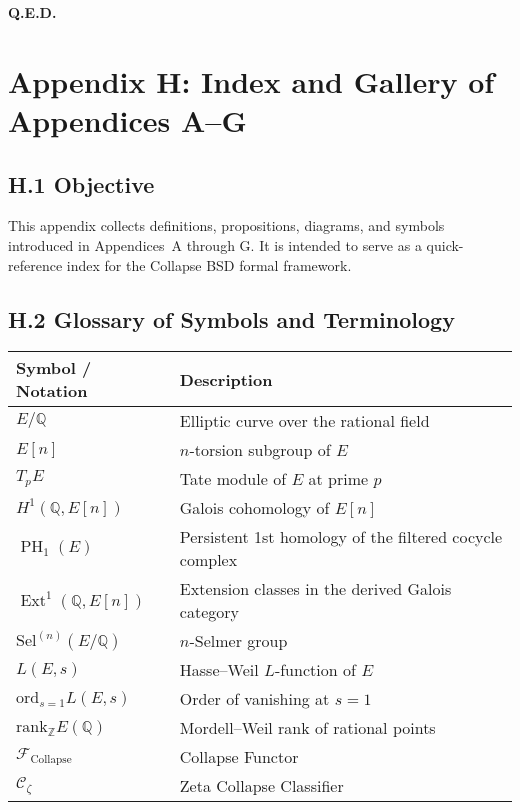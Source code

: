 \documentclass[11pt]{article}
\DeclareMathOperator{\Ext}{Ext}
\DeclareMathOperator{\PH}{PH}
\newcommand{\QQ}{\mathbb{Q}}
\newcommand{\ZZ}{\mathbb{Z}}
\begin{document}
\begin{flushright}
\textbf{Q.E.D.}
\end{flushright}




\section*{Appendix H: Index and Gallery of Appendices A--G}

\subsection*{H.1 Objective}

This appendix collects definitions, propositions, diagrams, and symbols introduced in Appendices~A through G.  
It is intended to serve as a quick-reference index for the Collapse BSD formal framework.

\subsection*{H.2 Glossary of Symbols and Terminology}

\begin{center}
\begin{tabular}{|l|l|}
\hline
\textbf{Symbol / Notation} & \textbf{Description} \\
\hline
$E/\QQ$ & Elliptic curve over the rational field \\
$E[n]$ & $n$-torsion subgroup of $E$ \\
$T_p E$ & Tate module of $E$ at prime $p$ \\
$H^1(\QQ, E[n])$ & Galois cohomology of $E[n]$ \\
$\PH_1(E)$ & Persistent 1st homology of the filtered cocycle complex \\
$\Ext^1(\QQ, E[n])$ & Extension classes in the derived Galois category \\
$\mathrm{Sel}^{(n)}(E/\QQ)$ & $n$-Selmer group \\
$L(E,s)$ & Hasse–Weil $L$-function of $E$ \\
$\mathrm{ord}_{s=1} L(E,s)$ & Order of vanishing at $s=1$ \\
$\mathrm{rank}_{\ZZ} E(\QQ)$ & Mordell–Weil rank of rational points \\
$\mathcal{F}_{\mathrm{Collapse}}$ & Collapse Functor \\
$\mathcal{C}_\zeta$ & Zeta Collapse Classifier \\
\hline
\end{tabular}
\end{center}
\end{document}
